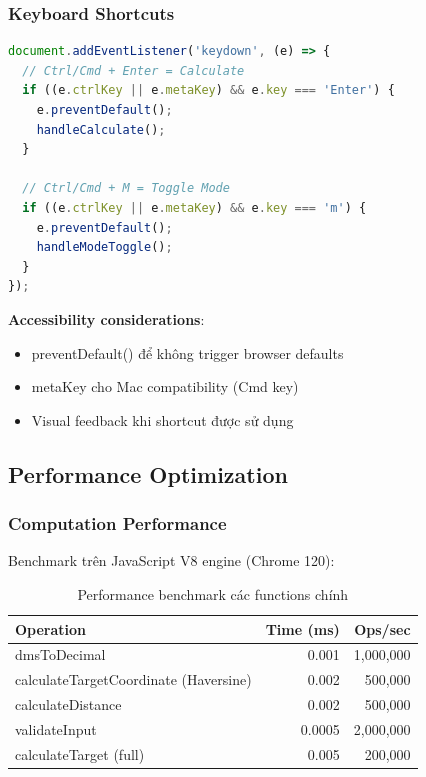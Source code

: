\subsubsection{Keyboard Shortcuts}

\begin{lstlisting}[language=JavaScript]
document.addEventListener('keydown', (e) => {
  // Ctrl/Cmd + Enter = Calculate
  if ((e.ctrlKey || e.metaKey) && e.key === 'Enter') {
    e.preventDefault();
    handleCalculate();
  }
  
  // Ctrl/Cmd + M = Toggle Mode
  if ((e.ctrlKey || e.metaKey) && e.key === 'm') {
    e.preventDefault();
    handleModeToggle();
  }
});
\end{lstlisting}

\textbf{Accessibility considerations}:
\begin{itemize}
    \item preventDefault() để không trigger browser defaults
    \item metaKey cho Mac compatibility (Cmd key)
    \item Visual feedback khi shortcut được sử dụng
\end{itemize}

\subsection{Performance Optimization}

\subsubsection{Computation Performance}

Benchmark trên JavaScript V8 engine (Chrome 120):

\begin{table}[H]
\centering
\begin{tabular}{|l|r|r|}
\hline
\textbf{Operation} & \textbf{Time (ms)} & \textbf{Ops/sec} \\
\hline
dmsToDecimal & 0.001 & 1,000,000 \\
calculateTargetCoordinate (Haversine) & 0.002 & 500,000 \\
calculateDistance & 0.002 & 500,000 \\
validateInput & 0.0005 & 2,000,000 \\
calculateTarget (full) & 0.005 & 200,000 \\
\hline
\end{tabular}
\caption{Performance benchmark các functions chính}
\end{table}

